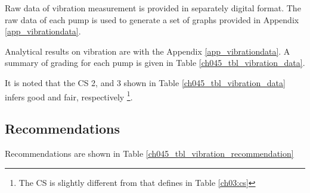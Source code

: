Raw data of vibration measurement is provided in separately digital format. The raw data of each pump is used to generate a set of graphs provided in Appendix \ref{app_vibrationdata}.

Analytical results on vibration are with the Appendix \ref{app_vibrationdata}. A summary of grading for each pump is given in Table \ref{ch045_tbl_vibration_data}.



It is noted that the CS 2, and 3 shown in Table \ref{ch045_tbl_vibration_data} infers good and fair, respectively \footnote{The CS is slightly different from that defines in Table \ref{ch03:cs}}. 

%

\subsection{Recommendations}


Recommendations are shown in Table \ref{ch045_tbl_vibration_recommendation}




